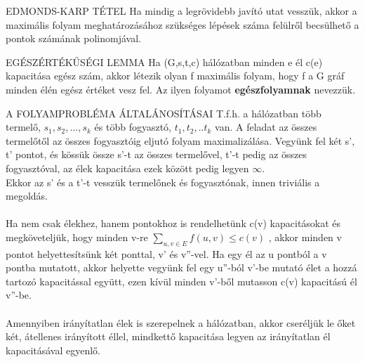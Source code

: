 \begin{tetel}{EDMONDS-KARP TÉTEL}
Ha mindig a legrövidebb javító utat vesszük, akkor a maximális folyam meghatározásához szükséges lépések száma felülről becsülhető a pontok számának polinomjával.
\end{tetel}

\begin{tetel}{EGÉSZÉRTÉKŰSÉGI LEMMA}
Ha (G,s,t,c) hálózatban minden e él c(e) kapacitása egész szám, akkor létezik olyan f maximális folyam, hogy f a G gráf minden élén egész értéket vesz fel. Az ilyen folyamot \textbf{egészfolyamnak} nevezzük.
\end{tetel}

\begin{tetel}{A FOLYAMPROBLÉMA ÁLTALÁNOSÍTÁSAI}
T.f.h. a hálózatban több termelő, $s_1, s_2,...,s_k$ és több fogyasztó, $t_1, t_2,..t_k$ van. A feladat az összes termelőtől az összes fogyasztóig eljutó folyam maximalizálása. Vegyünk fel két s', t' pontot, és kössük össze s'-t az összes termelővel, t'-t pedig az összes fogyasztóval, az élek kapacitása ezek között pedig legyen $\infty$.
\\
Ekkor az s' és a t'-t vesszük termelőnek és fogyasztónak, innen triviális a megoldás.
\\
\\
Ha nem csak élekhez, hanem pontokhoz is rendelhetünk c(v) kapacitásokat és megköveteljük, hogy minden v-re
$\sum_{u,v\in E}^{} f(u,v) \leq c(v)$
, akkor minden v pontot helyettesítsünk két ponttal, v' és v''-vel. Ha egy él az u pontból a v pontba mutatott, akkor helyette vegyünk fel egy u''-ból v'-be mutató élet a hozzá tartozó kapacitással együtt, ezen kívül minden v'-ből mutasson c(v) kapacitású él v''-be.
\\
\\
Amennyiben irányítatlan élek is szerepelnek a hálózatban, akkor cseréljük le őket két, átellenes irányított éllel, mindkettő kapacitása legyen az irányítatlan él kapacitásával egyenlő.
\end{tetel}